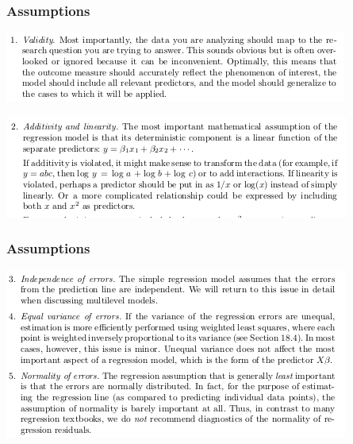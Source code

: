 \documentclass{beamer}
\begin{document}
\begin{frame}
  \frametitle{Assumptions}
  \includegraphics[width=\textwidth,height=0.5\textheight,keepaspectratio=true]{assumption_1}

  \includegraphics[width=\textwidth,height=0.5\textheight,keepaspectratio=true]{assumption_2}
\end{frame}


\begin{frame}
  \frametitle{Assumptions}
  \includegraphics[width=\textwidth,height=0.8\textheight,keepaspectratio=true]{assumption_3}
\end{frame}
\end{document}
